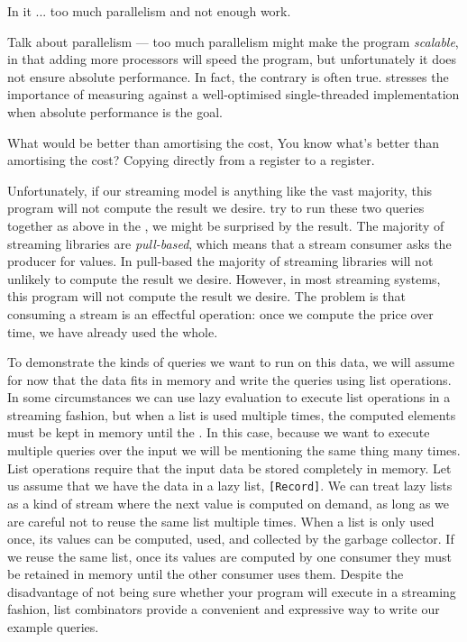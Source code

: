 In \cite{vrba2009evaluating} it ... too much parallelism and not enough work.

Talk about parallelism --- too much parallelism might make the program \emph{scalable}, in that adding more processors will speed the program, but unfortunately it does not ensure absolute performance.
In fact, the contrary is often true.
\cite{mcsherry2015scalability} stresses the importance of measuring against a well-optimised single-threaded implementation when absolute performance is the goal.



What would be better than amortising the cost, 
You know what's better than amortising the cost? Copying directly from a register to a register.




Unfortunately, if our streaming model is anything like the vast majority, this program will not compute the result we desire.
try to run these two queries together as above in the , we might be surprised by the result.
The majority of streaming libraries are \emph{pull-based}, which means that a stream consumer asks the producer for values.
In pull-based
the majority of streaming libraries will not unlikely to compute the result we desire.
However, in most streaming systems, this program will not compute the result we desire.
The problem is that consuming a stream is an effectful operation: once we compute the price over time, we have already used the whole.


To demonstrate the kinds of queries we want to run on this data, we will assume for now that the data fits in memory and write the queries using list operations.
In some circumstances we can use lazy evaluation to execute list operations in a streaming fashion, but when a list is used multiple times, the computed elements must be kept in memory until the .
In this case, because we want to execute multiple queries over the input we will be mentioning the same thing many times.
List operations require that the input data be stored completely in memory.
Let us assume that we have the data in a lazy list, \lstinline/[Record]/.
We can treat lazy lists as a kind of stream where the next value is computed on demand, as long as we are careful not to reuse the same list multiple times.
When a list is only used once, its values can be computed, used, and collected by the garbage collector.
If we reuse the same list, once its values are computed by one consumer they must be retained in memory until the other consumer uses them.
Despite the disadvantage of not being sure whether your program will execute in a streaming fashion, list combinators provide a convenient and expressive way to write our example queries.


